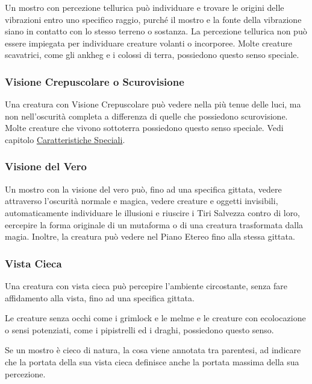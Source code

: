 \begin{multicols}{2}
	Un mostro con percezione tellurica può individuare e trovare le origini delle vibrazioni entro uno specifico raggio, purché il mostro e la fonte della vibrazione siano in contatto con lo stesso terreno o sostanza. La percezione tellurica non può essere impiegata per individuare creature volanti o incorporee. Molte creature scavatrici, come gli ankheg e i colossi di terra, possiedono questo senso speciale.

	\subsubsection{Visione Crepuscolare o Scurovisione}

	Una creatura con Visione Crepuscolare può vedere nella più tenue delle luci, ma non nell'oscurità completa a differenza di quelle che possiedono scurovisione. Molte creature che vivono sottoterra possiedono questo senso speciale.  Vedi capitolo \hyperlink{visioneeluce}{Caratteristiche Speciali}.

	\subsubsection{Visione del Vero}

	Un mostro con la visione del vero può, fino ad una specifica gittata, vedere attraverso l'oscurità normale e magica, vedere creature e oggetti invisibili, automaticamente individuare le illusioni e riuscire i Tiri Salvezza contro di loro, eercepire la forma originale di un mutaforma o di una creatura trasformata dalla magia. Inoltre, la creatura può vedere nel Piano Etereo fino alla stessa gittata.

	\subsubsection{Vista Cieca}

	Una creatura con vista cieca può percepire l'ambiente circostante, senza fare affidamento alla vista, fino ad una specifica gittata.

	Le creature senza occhi come i grimlock e le melme e le creature con ecolocazione o sensi potenziati, come i pipistrelli ed i draghi, possiedono questo senso.

	Se un mostro è cieco di natura, la cosa viene annotata tra parentesi, ad indicare che la portata della sua vista cieca definisce anche la portata massima della sua percezione.


\end{multicols}
